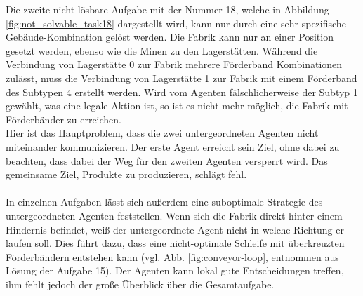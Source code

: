 \newpage
Die zweite nicht lösbare Aufgabe mit der Nummer 18, welche in Abbildung \ref{fig:not_solvable_task18} dargestellt wird, kann nur durch eine sehr spezifische Gebäude-Kombination gelöst werden. Die Fabrik kann nur an einer Position gesetzt werden, ebenso wie die Minen zu den Lagerstätten. Während die Verbindung von Lagerstätte 0 zur Fabrik mehrere Förderband Kombinationen zulässt, muss die Verbindung von Lagerstätte 1 zur Fabrik mit einem Förderband des Subtypen 4 erstellt werden. Wird vom Agenten fälschlicherweise der Subtyp 1 gewählt, was eine legale Aktion ist, so ist es nicht mehr möglich, die Fabrik mit Förderbänder zu erreichen. \\
Hier ist das Hauptproblem, dass die zwei untergeordneten Agenten nicht miteinander kommunizieren. Der erste Agent erreicht sein Ziel, ohne dabei zu beachten, dass dabei der Weg für den zweiten Agenten versperrt wird. Das gemeinsame Ziel, Produkte zu produzieren, schlägt fehl. 
\\\\
In einzelnen Aufgaben lässt sich außerdem eine suboptimale-Strategie des untergeordneten Agenten feststellen. 
Wenn sich die Fabrik direkt hinter einem Hindernis befindet, weiß der untergeordnete Agent nicht in welche Richtung er laufen soll. Dies führt dazu, dass eine nicht-optimale Schleife mit überkreuzten Förderbändern entstehen kann (vgl. Abb. \ref{fig:conveyor-loop}, entnommen aus Lösung der Aufgabe 15). Der Agenten kann lokal gute Entscheidungen treffen, ihm fehlt jedoch der große Überblick über die Gesamtaufgabe.

